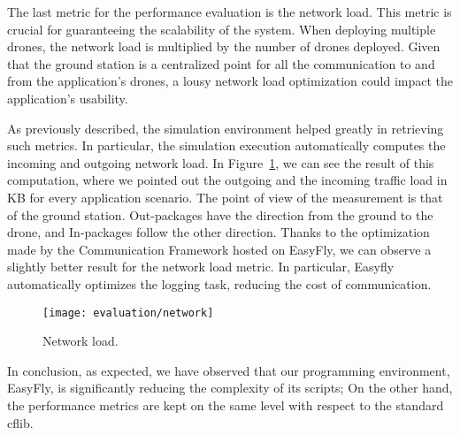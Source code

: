 The last metric for the performance evaluation is the network load. 
This metric is crucial for guaranteeing the scalability of the system. 
When deploying multiple drones, the network load is multiplied by the number of drones deployed.
Given that the ground station is a centralized point for all the communication to and from the application's drones, a lousy network load optimization could impact the application's usability.

As previously described, the simulation environment helped greatly in retrieving such metrics. 
In particular, the simulation execution automatically computes the incoming and outgoing network load. 
In Figure~\ref{fig:network_load}, we can see the result of this computation, where we pointed out the outgoing and the incoming traffic load in KB for every application scenario.
The point of view of the measurement is that of the ground station. Out-packages have the direction from the ground to the drone, and In-packages follow the other direction. 
Thanks to the optimization made by the Communication Framework hosted on EasyFly, we can observe a slightly better result for the network load metric.
In particular, Easyfly automatically optimizes the logging task, reducing the cost of communication.

\begin{figure}[tb]
    \centering
    \texttt{[image: evaluation/network]}
    \caption{Network load.}\label{fig:network_load}
\end{figure}

In conclusion, as expected, we have observed that our programming environment, EasyFly, is significantly reducing the complexity of its scripts; 
On the other hand, the performance metrics are kept on the same level with respect to the standard cflib.